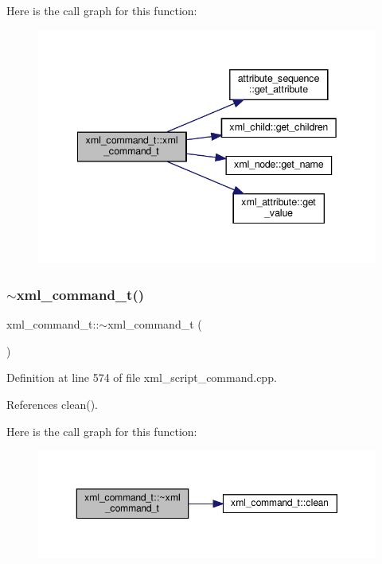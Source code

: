 Here is the call graph for this function\+:
\nopagebreak
\begin{figure}[H]
\begin{center}
\leavevmode
\includegraphics[width=342pt]{d4/db0/classxml__command__t_a9c8e18a3d1c0a2cd274c2a0d2ba6cab5_cgraph}
\end{center}
\end{figure}
\mbox{\label{classxml__command__t_a6eedad9e30d94e00147910ac0df8e9d8}} 
\subsubsection{\texorpdfstring{$\sim$xml\+\_\+command\+\_\+t()}{~xml\_command\_t()}}
{\footnotesize\ttfamily xml\+\_\+command\+\_\+t\+::$\sim$xml\+\_\+command\+\_\+t (\begin{DoxyParamCaption}{ }\end{DoxyParamCaption})\hspace{0.3cm}{\ttfamily [override]}}



Definition at line 574 of file xml\+\_\+script\+\_\+command.\+cpp.



References clean().

Here is the call graph for this function\+:
\nopagebreak
\begin{figure}[H]
\begin{center}
\leavevmode
\includegraphics[width=350pt]{d4/db0/classxml__command__t_a6eedad9e30d94e00147910ac0df8e9d8_cgraph}
\end{center}
\end{figure}


